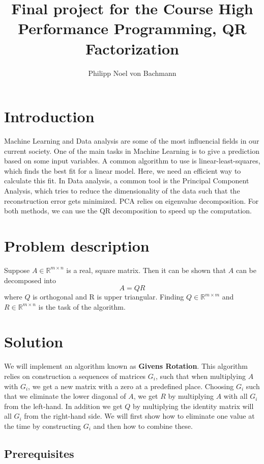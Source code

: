 \documentclass[a4paper]{scrartcl}
\title{Final project for the Course High Performance Programming, QR Factorization}
\author{Philipp Noel von Bachmann}
\begin{document}
\maketitle
\section{Introduction}
    Machine Learning and Data analysis are some of the most influencial fields
    in our current society. One of the main tasks in Machine Learning is to give
    a prediction based on some input variables. A common algorithm to use is
    linear-least-squares, which finds the best fit for a linear model. Here, we
    need an efficient way to calculate this fit. In Data analysis, a common tool
    is the Principal Component Analysis, which tries to reduce the
    dimensionality of the data such that the reconstruction error gets
    minimized. PCA relies on eigenvalue decomposition. For both methods, we
    can use the QR decomposition to speed up the computation.


\section{Problem description}
    Suppose $A \in \mathbb{R}^{m\times n}$ is a real, square matrix. Then it can be shown that $A$ can be
    decomposed into 
    \begin{equation}\label{eq:QR}
        A = QR
    \end{equation}
    where $Q$ is orthogonal and R is upper triangular. Finding $Q \in \mathbb{R}^{m\times m}$ and $R \in \mathbb{R}^{m\times n}$ is
    the task of the algorithm.

\section{Solution}
    We will implement an algorithm known as \textbf{Givens Rotation}. This
    algorithm relies on construction a sequences of matrices $G_i$, such that
    when multiplying $A$ with $G_i$, we get a new matrix with a zero at a
    predefined place. Choosing $G_i$ such that we eliminate the lower diagonal
    of $A$, we get $R$ by multiplying $A$ with all $G_i$ from the left-hand. In
    addition we get $Q$ by multiplying the identity matrix will all $G_i$ from
    the right-hand side. We will first show how to eliminate one value at the
    time by constructing $G_i$ and then how to combine these.

    \subsection{Prerequisites}
\end{document}
